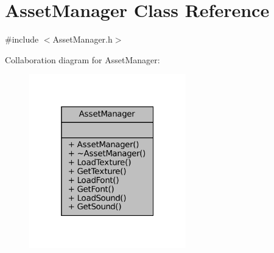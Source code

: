 \hypertarget{classAssetManager}{}\section{Asset\+Manager Class Reference}
\label{classAssetManager}


{\ttfamily \#include $<$Asset\+Manager.\+h$>$}



Collaboration diagram for Asset\+Manager\+:\nopagebreak
\begin{figure}[H]
\begin{center}
\leavevmode
\includegraphics[width=193pt]{classAssetManager__coll__graph}
\end{center}
\end{figure}
